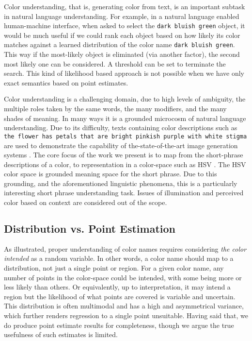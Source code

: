 \documentclass[]{clv3}
\newcommand{\parencite}{\citep}
\begin{document}
Color understanding, that is, generating color from text, is an important subtask in natural language understanding.
For example, in a natural language enabled human-machine interface, when asked to select the \texttt{dark bluish green} object, it would be much useful if we could rank each object based on how likely its color matches against a learned distribution of the color name \texttt{dark bluish green}. 
This way if the most-likely object is eliminated (via another factor), the second most likely one can be considered.
A threshold can be set to terminate the search.
This kind of likelihood based approach is not possible when we have only exact semantics based on point estimates. 


Color understanding is a challenging domain, due to high levels of ambiguity, the multiple roles taken by the same words, the many modifiers, and the many shades of meaning.
In many ways it is a grounded microcosm of natural language understanding.
Due to its difficulty, texts containing color descriptions such as \texttt{the flower has petals that are bright pinkish purple with white stigma} are used to demonstrate the  capability of the-state-of-the-art image generation systems \parencite{reed2016generative, 2015arXiv151102793M}.
The core focus of the work we present is to map from the short-phrase descriptions of a color, to representation in a color-space such as HSV \parencite{smith1978color}.
The HSV color space is grounded meaning space for the short phrase.
Due to this grounding, and the aforementioned linguistic phenomena, this is a particularly interesting short phrase understanding task.
Issues of illumination and perceived color based on context are considered out of the scope.

\subsection{Distribution vs. Point Estimation}
As illustrated, proper understanding of color names requires considering \emph{the color intended} as a random variable.
In other words, a color name should map to a distribution, not just a single point or region.
For a given color name, any number of points in the color-space could be intended, with some being more or less likely than others.
Or equivalently, up to interpretation, it may intend a region but the likelihood of what points are covered is variable and uncertain.
This distribution is often multimodal and has a high and asymmetrical variance, which further renders regression to a single point unsuitable.
Having said that, we do produce point estimate results for completeness, though we argue the true usefulness of such estimates is limited.
\end{document}
